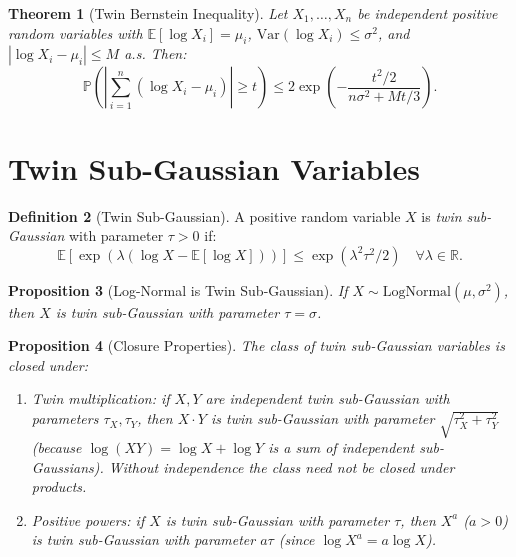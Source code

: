 \documentclass[11pt,twoside,openright]{book}
\theoremstyle{plain}
\newtheorem{theorem}{Theorem}[chapter]
\newtheorem{proposition}[theorem]{Proposition}
\theoremstyle{definition}
\newtheorem{definition}[theorem]{Definition}
\theoremstyle{remark}
\newcommand{\Rd}{\mathbb{R}}
\newcommand{\abs}[1]{|#1|}
\newcommand{\E}{\mathbb{E}}
\newcommand{\Prob}{\mathbb{P}}
\newcommand{\var}{\mathrm{Var}}
\begin{document}
\begin{theorem}[Twin Bernstein Inequality]
\label{thm:twin-bernstein}
Let $X_1, \ldots, X_n$ be independent positive random variables with $\E[\log X_i] = \mu_i$, $\var(\log X_i) \leq \sigma^2$, and $|\log X_i - \mu_i| \leq M$ a.s. Then:
\begin{equation}
\Prob\left(\abs{\sum_{i=1}^n (\log X_i - \mu_i)} \geq t\right) \leq 2\exp\left(-\frac{t^2/2}{n\sigma^2 + Mt/3}\right).
\label{eq:twin-bernstein}
\end{equation}
\end{theorem}

\section{Twin Sub-Gaussian Variables}

\begin{definition}[Twin Sub-Gaussian]
A positive random variable $X$ is \emph{twin sub-Gaussian} with parameter $\tau > 0$ if:
\begin{equation}
\E[\exp(\lambda(\log X - \E[\log X]))] \leq \exp(\lambda^2 \tau^2 / 2) \quad \forall \lambda \in \Rd.
\label{eq:twin-subgaussian}
\end{equation}
\end{definition}

\begin{proposition}[Log-Normal is Twin Sub-Gaussian]
If $X \sim \text{LogNormal}(\mu, \sigma^2)$, then $X$ is twin sub-Gaussian with parameter $\tau = \sigma$.
\end{proposition}

\begin{proposition}[Closure Properties]
The class of twin sub-Gaussian variables is closed under:
\begin{enumerate}[label=(\roman*)]
\item Twin multiplication: if $X, Y$ are \emph{independent} twin sub-Gaussian with parameters $\tau_X,\tau_Y$, then $X\cdot Y$ is twin sub-Gaussian with parameter $\sqrt{\tau_X^2+\tau_Y^2}$ (because $\log(XY)=\log X+\log Y$ is a sum of independent sub-Gaussians). Without independence the class need not be closed under products.
\item Positive powers: if $X$ is twin sub-Gaussian with parameter $\tau$, then $X^a$ ($a>0$) is twin sub-Gaussian with parameter $a\tau$ (since $\log X^a=a\log X$).
\end{enumerate}
\end{proposition}
\end{document}
